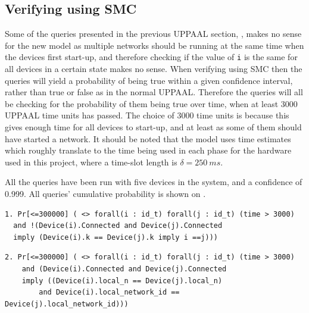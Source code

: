 
\subsection*{Verifying using SMC}

Some of the queries presented in the previous UPPAAL section, , makes no sense for the new model as multiple networks should be running at the same time when the devices first start-up, and therefore checking if the value of \texttt{i} is the same for all devices in a certain state makes no sense.
When verifying using SMC then the queries will yield a probability of being true within a given confidence interval, rather than true or false as in the normal UPPAAL.
Therefore the queries will all be checking for the probability of them being true over time, when at least 3000 UPPAAL time units has passed.
The choice of 3000 time units is because this gives enough time for all devices to start-up, and at least as some of them should have started a network. 
It should be noted that the model uses time estimates which roughly translate to the time being used in each phase for the hardware used in this project, where a time-slot length is $\delta = 250\ ms$.

All the queries have been run with five devices in the system, and a confidence of 0.999.
All queries' cumulative probability is shown on .

\begin{lstlisting}[style=UPPAAL, title={This query asks for the probability that it is false that two devices which are connected have the same k, only if they are the same device. When run with a confidence of 99.9\% this query will within 3797 runs result in [0, 0.00199982], the query takes 799 seconds on the same laptop used in \myref{sec:verifyingTheModel}.}]
1. Pr[<=300000] ( <> forall(i : id_t) forall(j : id_t) (time > 3000)
  and !(Device(i).Connected and Device(j).Connected
  imply (Device(i).k == Device(j).k imply i ==j)))
\end{lstlisting}

\begin{lstlisting}[style=UPPAAL, title={This query asks after 3000 UPPAAL time units have passed, what then is the probability that if two devices \texttt{i}, and \texttt{j} are connected to a network that their local values of \texttt{n} are the same, and that they are both connected to the same network. This means that the devices are connected to the same network. UPPAAL runs this query and within 3451 runs [0.998,1] with confidence 99.9 \% this is true. The query had a run-time of 46 seconds. }]
2. Pr[<=300000] ( <> forall(i : id_t) forall(j : id_t) (time > 3000) 
    and (Device(i).Connected and Device(j).Connected 
    imply ((Device(i).local_n == Device(j).local_n)
        and Device(i).local_network_id == Device(j).local_network_id)))     
\end{lstlisting}

